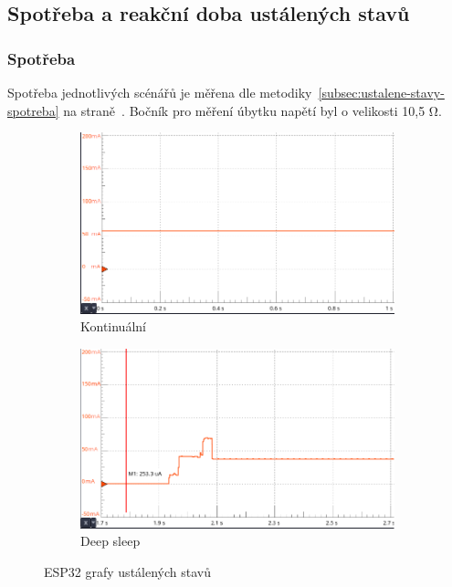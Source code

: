 \documentclass[a4paper, 12pt]{report}
\begin{document}
    \subsection{Spotřeba a reakční doba ustálených stavů}

    \subsubsection{Spotřeba}
    Spotřeba jednotlivých scénářů je měřena dle metodiky~\ref{subsec:ustalene-stavy-spotreba} na straně~\pageref{subsec:ustalene-stavy-spotreba}.
    Bočník pro měření úbytku napětí byl o velikosti 10,5 \si{\ohm}.\par
    \begin{figure}[h!]
        \centering
        \begin{subfigure}[b]{0.6\linewidth}
            \includegraphics[width=\linewidth]{images/ESP32_on_waiting}
            \caption{Kontinuální}
        \end{subfigure}
        \begin{subfigure}[b]{0.6\linewidth}
            \includegraphics[width=\linewidth]{images/ESP32_deepsleep_waiting}
            \caption{Deep sleep}
        \end{subfigure}
        \caption{ESP32 grafy ustálených stavů}
        \label{fig:esp32-waiting}
    \end{figure}
\end{document}
